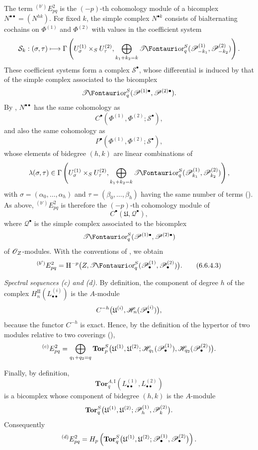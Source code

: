 \begin{env}[6.6.4]
The term ${}^{(b')}E_{pq}^2$ is the $(-p)$-th cohomology module
of a bicomplex $N^{\bullet\bullet}=(N^{hk})$.  For fixed $k$,
the simple complex $N^{\bullet k}$ consists of bialternating
cochains on $\Phi^{(1)}$ and $\Phi^{(2)}$ with values in the
coefficient system
\[
  \mathcal S_k:(\sigma,\tau)\longmapsto
  \Gamma\left(
    U_\sigma^{(1)}\times_SU_\tau^{(2)},
    \bigoplus_{k_1+k_2=k}
    \shTor_q^S(\sh P_{-k_1}^{(1)},\sh P_{-k_2}^{(2)})
  \right).
\]
These coefficient systems form a complex
$\mathcal S^\bullet$, whose differential is induced by that of
the simple complex associated to the bicomplex
\[
  \shTor_q^S
  (\sh P^{(1)\bullet},\sh P^{(2)\bullet}).
\]
By , $N^{\bullet\bullet}$ has the same
cohomology as
\[
  C^\bullet
  (\Phi^{(1)},\Phi^{(2)};\mathcal S^\bullet),
\]
and also the same cohomology as
\[
  P^\bullet
  (\Phi^{(1)},\Phi^{(2)};\mathcal S^\bullet),
\]
whose elements of bidegree $(h,k)$ are linear combinations of
\[
  \lambda(\sigma,\tau)\in
  \Gamma\left(
    U_\sigma^{(1)}\times_SU_\tau^{(2)},
    \bigoplus_{k_1+k_2=k}
    \shTor_q^S(\sh P_{k_1}^{(1)},\sh P_{k_2}^{(2)})
  \right),
\]
with $\sigma=(\alpha_0,\ldots,\alpha_h)$ and
$\tau=(\beta_0,\ldots,\beta_h)$ having the same number of terms
().  As above, ${}^{(b')}E_{pq}^2$ is
therefore the $(-p)$-th cohomology module of
\[
  C^\bullet(\mathfrak U,\mathcal Q^\bullet),
\]
where $\mathcal Q^\bullet$ is the simple complex associated to
the bicomplex
\[
  \shTor_q^S
  (\sh P^{(1)\bullet},\sh P^{(2)\bullet})
\]
of $\mathscr{O}_Z$-modules.  With the conventions of
, we obtain
\[
  {}^{(b')}E_{pq}^2
  =
  \HH^{-p}
  \bigl(
    Z,\shTor_q^S
    (\sh P_\bullet^{(1)},\sh P_\bullet^{(2)})
  \bigr).
  \tag{6.6.4.3}\label{III.6.6.4.3}
\]
\end{env}


\begin{env}[6.6.5]
\label{III.6.6.5}
\emph{Spectral sequences \textnormal{(c)} and
\textnormal{(d)}.}
By definition, the component of degree $h$ of the complex
$H_n^{\mathrm{II}}(L_{\bullet\bullet}^{(i)})$ is the
$A$-module
\[
  C^{-h}
  \bigl(
    \mathfrak U^{(i)},
    \mathscr{H}_n(\mathscr{P}_\bullet^{(i)})
  \bigr),
\]
because the functor $C^{-h}$ is exact.  Hence, by the definition
of the hypertor of two modules relative to two coverings
(),
\[
  {}^{(c)}E_{pq}^2
  =
  \bigoplus_{q_1+q_2=q}
  \mathbf{Tor}_p^S
  \bigl(
    \mathfrak U^{(1)},\mathfrak U^{(2)};
    \mathscr{H}_{q_1}(\mathscr{P}_\bullet^{(1)}),
    \mathscr{H}_{q_2}(\mathscr{P}_\bullet^{(2)})
  \bigr).
\]

Finally, by definition,
\[
  \mathbf{Tor}_q^{A,\mathrm I}
  (L_{\bullet\bullet}^{(1)},L_{\bullet\bullet}^{(2)})
\]
is a bicomplex whose component of bidegree $(h,k)$ is the
$A$-module
\[
  \mathbf{Tor}_q^S
  \bigl(
    \mathfrak U^{(1)},\mathfrak U^{(2)};
    \mathscr{P}_h^{(1)},\mathscr{P}_k^{(2)}
  \bigr).
\]
Consequently
\[
  {}^{(d)}E_{pq}^2
  =
  H_p\left(
    \mathbf{Tor}_q^S
    \bigl(
      \mathfrak U^{(1)},\mathfrak U^{(2)};
      \mathscr{P}_\bullet^{(1)},\mathscr{P}_\bullet^{(2)}
    \bigr)
  \right).
\]
\end{env}

